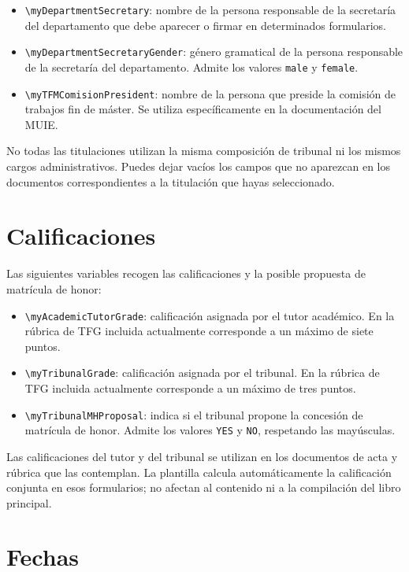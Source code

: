 \begin{itemize}
  \item \texttt{\textbackslash{}myDepartmentSecretary}: nombre de la persona responsable de la secretaría del departamento que debe aparecer o firmar en determinados formularios.
  \item \texttt{\textbackslash{}myDepartmentSecretaryGender}: género gramatical de la persona responsable de la secretaría del departamento. Admite los valores \texttt{male} y \texttt{female}.
  \item \texttt{\textbackslash{}myTFMComisionPresident}: nombre de la persona que preside la comisión de trabajos fin de máster. Se utiliza específicamente en la documentación del MUIE.
\end{itemize}

No todas las titulaciones utilizan la misma composición de tribunal ni los mismos cargos administrativos. Puedes dejar vacíos los campos que no aparezcan en los documentos correspondientes a la titulación que hayas seleccionado.

\section{Calificaciones}

Las siguientes variables recogen las calificaciones y la posible propuesta de matrícula de honor:

\begin{itemize}
  \item \texttt{\textbackslash{}myAcademicTutorGrade}: calificación asignada por el tutor académico. En la rúbrica de TFG incluida actualmente corresponde a un máximo de siete puntos.
  \item \texttt{\textbackslash{}myTribunalGrade}: calificación asignada por el tribunal. En la rúbrica de TFG incluida actualmente corresponde a un máximo de tres puntos.
  \item \texttt{\textbackslash{}myTribunalMHProposal}: indica si el tribunal propone la concesión de matrícula de honor. Admite los valores \texttt{YES} y \texttt{NO}, respetando las mayúsculas.
\end{itemize}

Las calificaciones del tutor y del tribunal se utilizan en los documentos de acta y rúbrica que las contemplan. La plantilla calcula automáticamente la calificación conjunta en esos formularios; no afectan al contenido ni a la compilación del libro principal.

\section{Fechas}

